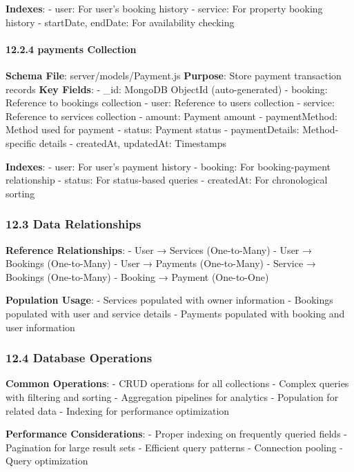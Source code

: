 \documentclass[12pt,a4paper]{article}
\begin{document}
\textbf{Indexes}: - user: For user's booking history - service: For
property booking history - startDate, endDate: For availability checking

\hypertarget{payments-collection}{%
\paragraph{12.2.4 payments Collection}\label{payments-collection}}

\textbf{Schema File}: server/models/Payment.js \textbf{Purpose}: Store
payment transaction records \textbf{Key Fields}: - \_id: MongoDB
ObjectId (auto-generated) - booking: Reference to bookings collection -
user: Reference to users collection - service: Reference to services
collection - amount: Payment amount - paymentMethod: Method used for
payment - status: Payment status - paymentDetails: Method-specific
details - createdAt, updatedAt: Timestamps

\textbf{Indexes}: - user: For user's payment history - booking: For
booking-payment relationship - status: For status-based queries -
createdAt: For chronological sorting

\hypertarget{data-relationships}{%
\subsubsection{12.3 Data Relationships}\label{data-relationships}}

\textbf{Reference Relationships}: - User → Services (One-to-Many) - User
→ Bookings (One-to-Many) - User → Payments (One-to-Many) - Service →
Bookings (One-to-Many) - Booking → Payment (One-to-One)

\textbf{Population Usage}: - Services populated with owner information -
Bookings populated with user and service details - Payments populated
with booking and user information

\hypertarget{database-operations}{%
\subsubsection{12.4 Database Operations}\label{database-operations}}

\textbf{Common Operations}: - CRUD operations for all collections -
Complex queries with filtering and sorting - Aggregation pipelines for
analytics - Population for related data - Indexing for performance
optimization

\textbf{Performance Considerations}: - Proper indexing on frequently
queried fields - Pagination for large result sets - Efficient query
patterns - Connection pooling - Query optimization
\end{document}
